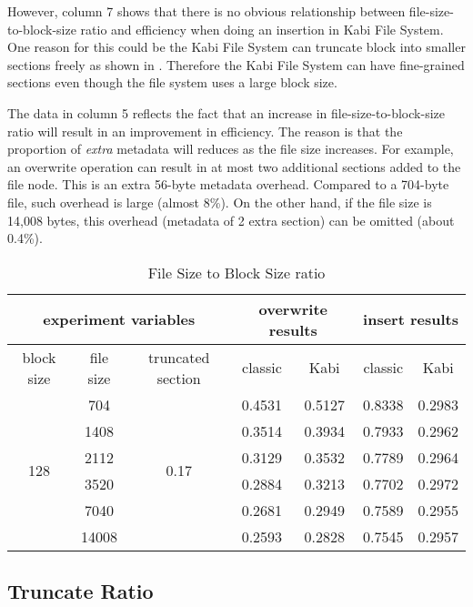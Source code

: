     However, column 7 shows that there is no obvious relationship between file-size-to-block-size ratio and efficiency when doing an insertion in Kabi File System. One reason for this could be the Kabi File System can truncate block into smaller sections freely as shown in . Therefore the Kabi File System can have fine-grained sections even though the file system uses a large block size.
    
    The data in column 5 reflects the fact that an increase in file-size-to-block-size ratio will result in an improvement in efficiency. The reason is that the proportion of \emph{extra} metadata will reduces as the file size increases. For example, an overwrite operation can result in at most two additional sections added to the file node. This is an extra 56-byte metadata overhead. Compared to a 704-byte file, such overhead is large (almost 8\%). On the other hand, if the file size is 14,008 bytes, this overhead (metadata of 2 extra section) can be omitted (about 0.4\%).

\begin{table}[t]
\begin{center}
\begin{tabular}{|c|c|c|cccc|}
\hline
\multicolumn{3}{|c|}{experiment variables} & \multicolumn{2}{c|}{overwrite results} & \multicolumn{2}{c|}{insert results}\\
\hline
block size & file size & truncated section & \multicolumn{1}{c|}{classic} & \multicolumn{1}{c|}{Kabi} & \multicolumn{1}{c|}{classic} & Kabi\\
\hline
\multirow{6}{*}{128} & 704 & \multirow{6}{*}{0.17} & 0.4531 & 0.5127 & 0.8338 & 0.2983 \\
& 1408 & & 0.3514 & 0.3934 & 0.7933 & 0.2962 \\
& 2112 & & 0.3129 & 0.3532 & 0.7789 & 0.2964 \\
& 3520 & & 0.2884 & 0.3213 & 0.7702 & 0.2972 \\
& 7040 & & 0.2681 & 0.2949 & 0.7589 & 0.2955 \\
& 14008 & & 0.2593 & 0.2828 & 0.7545 & 0.2957 \\
\hline
\end{tabular}
\end{center}
\caption{File Size to Block Size ratio}
\label{tab:fb_ratio}
\end{table}

\subsection{Truncate Ratio}

